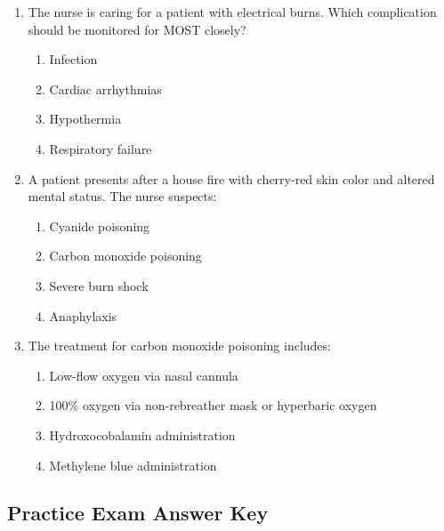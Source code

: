 \documentclass[11pt]{article}
\begin{document}
\begin{enumerate}
\item The nurse is caring for a patient with electrical burns. Which complication should be monitored for MOST closely?

\begin{enumerate}[label=\Alph*.]
    \item Infection
    \item Cardiac arrhythmias
    \item Hypothermia
    \item Respiratory failure
\end{enumerate}

\item A patient presents after a house fire with cherry-red skin color and altered mental status. The nurse suspects:

\begin{enumerate}[label=\Alph*.]
    \item Cyanide poisoning
    \item Carbon monoxide poisoning
    \item Severe burn shock
    \item Anaphylaxis
\end{enumerate}

\item The treatment for carbon monoxide poisoning includes:

\begin{enumerate}[label=\Alph*.]
    \item Low-flow oxygen via nasal cannula
    \item 100\% oxygen via non-rebreather mask or hyperbaric oxygen
    \item Hydroxocobalamin administration
    \item Methylene blue administration
\end{enumerate}

\end{enumerate}

\newpage
\subsection*{Practice Exam Answer Key}
\end{document}
